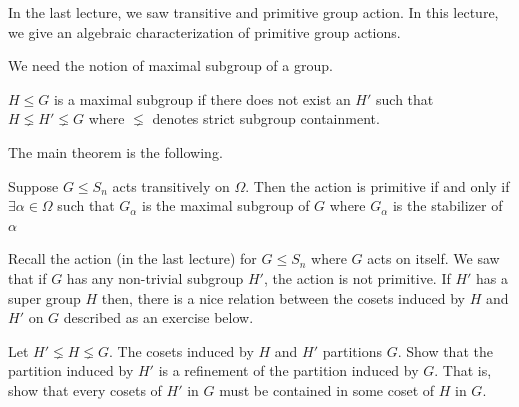 
In the last lecture, we saw transitive and primitive group action. In this
lecture, we give an algebraic characterization of primitive group actions.

We need the notion of maximal subgroup of a group.
\begin{definition}
$H \leq G$ is a maximal subgroup if there does not exist an $H'$ such that 
$H \lneq H' \lneq G$ where $\lneq$ denotes strict subgroup containment.
\end{definition}

The main theorem is the following.
\begin{theorem}
	Suppose $G \le S_n$ acts transitively on $\Omega$. Then the action is
	primitive if and only if $\exists \alpha \in \Omega$ such that
	$G_{\alpha}$ is the maximal subgroup of $G$ where $G_\alpha$ is the
	stabilizer of $\alpha$
	\label{thm:primitive-action}
\end{theorem}

Recall the action (in the last lecture) for $G \le S_n$ where $G$ acts on
itself. We saw that if $G$ has any non-trivial subgroup $H'$, the action is
not primitive. If $H'$ has a super group $H$ then, there is a nice relation
between the cosets induced by $H$ and $H'$ on $G$ described as an exercise
below.
\begin{exercise}
	Let $H' \lneq H \lneq G$. The cosets induced by $H$ and $H'$
	partitions $G$. Show that the partition induced by $H'$ is a
	refinement of the partition induced by $G$. That is, show that
	every cosets of $H'$ in $G$ must be contained in some coset of $H$ in
$G$.  
\end{exercise}

